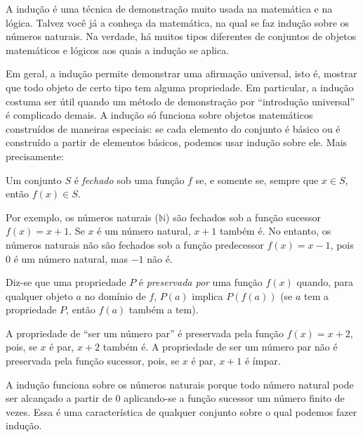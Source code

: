 \documentclass[../../include/open-logic-section]{subfiles}
\begin{document}


\begin{explain}
A indução é uma técnica de demonstração muito usada na matemática e na lógica.
Talvez você já a conheça da matemática, na qual se faz indução sobre os
números naturais. Na verdade, há muitos tipos diferentes de conjuntos de
objetos matemáticos e lógicos aos quais a indução se aplica.

Em geral, a indução permite demonstrar uma afirmação universal, isto é,
mostrar que todo objeto de certo tipo tem alguma propriedade. Em particular,
a indução costuma ser útil quando um método de demonstração por ``introdução
universal'' é complicado demais. A indução só funciona sobre objetos
matemáticos construídos de maneiras especiais: se cada elemento do conjunto
é básico ou é construído a partir de elementos básicos, podemos usar indução
sobre ele. Mais precisamente:
\end{explain}

\begin{defn}
Um conjunto $S$ é \emph{fechado} sob uma função $f$ se, e somente se,
sempre que $x \in S$, então $f(x) \in S$.
\end{defn}

\begin{explain}
Por exemplo, os números naturais ($\mathbb{N}$) são fechados sob a função
sucessor $f(x) = x+1$. Se $x$ é um número natural, $x+1$ também é. No
entanto, os números naturais não são fechados sob a função predecessor
$f(x) = x-1$, pois $0$ é um número natural, mas $-1$ não é.
\end{explain}

\begin{defn}
Diz-se que uma propriedade $P$ é \emph{preservada por} uma função $f(x)$
quando, para qualquer objeto $a$ no domínio de $f$, $P(a)$ implica
$P(f(a))$ (se $a$ tem a propriedade $P$, então $f(a)$ também a tem).
\end{defn}

\begin{explain}
A propriedade de ``ser um número par'' é preservada pela função
$f(x) = x+2$, pois, se $x$ é par, $x+2$ também é. A propriedade de ser
um número par não é preservada pela função sucessor, pois, se $x$ é par,
$x+1$ é ímpar.

A indução funciona sobre os números naturais porque todo número natural
pode ser alcançado a partir de 0 aplicando-se a função sucessor um número
finito de vezes. Essa é uma característica de qualquer conjunto sobre o
qual podemos fazer indução.
\end{explain}
\end{document}
